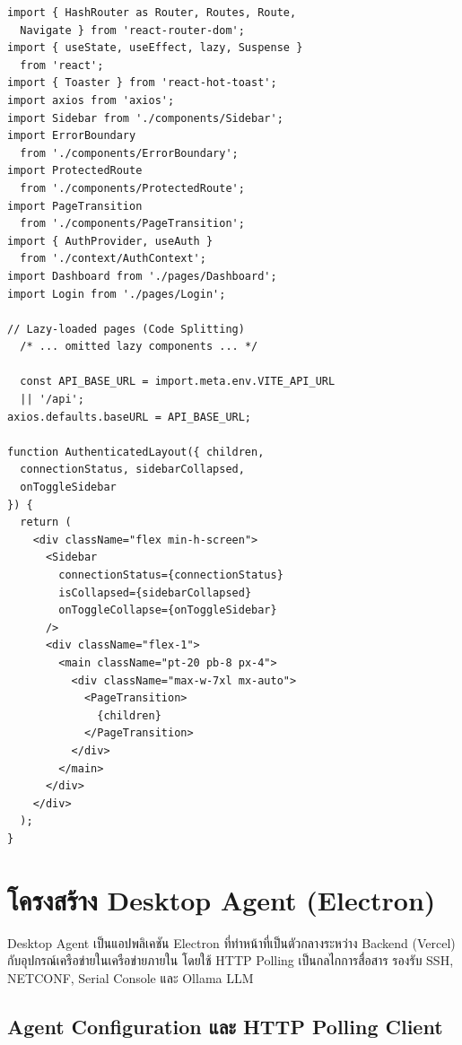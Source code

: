 \begin{lstlisting}[language=JSX, caption={frontend/src/App.jsx -- React Router และ Lazy Loading}]
import { HashRouter as Router, Routes, Route,
  Navigate } from 'react-router-dom';
import { useState, useEffect, lazy, Suspense }
  from 'react';
import { Toaster } from 'react-hot-toast';
import axios from 'axios';
import Sidebar from './components/Sidebar';
import ErrorBoundary
  from './components/ErrorBoundary';
import ProtectedRoute
  from './components/ProtectedRoute';
import PageTransition
  from './components/PageTransition';
import { AuthProvider, useAuth }
  from './context/AuthContext';
import Dashboard from './pages/Dashboard';
import Login from './pages/Login';

// Lazy-loaded pages (Code Splitting)
  /* ... omitted lazy components ... */

  const API_BASE_URL = import.meta.env.VITE_API_URL
  || '/api';
axios.defaults.baseURL = API_BASE_URL;

function AuthenticatedLayout({ children,
  connectionStatus, sidebarCollapsed,
  onToggleSidebar
}) {
  return (
    <div className="flex min-h-screen">
      <Sidebar
        connectionStatus={connectionStatus}
        isCollapsed={sidebarCollapsed}
        onToggleCollapse={onToggleSidebar}
      />
      <div className="flex-1">
        <main className="pt-20 pb-8 px-4">
          <div className="max-w-7xl mx-auto">
            <PageTransition>
              {children}
            </PageTransition>
          </div>
        </main>
      </div>
    </div>
  );
}
\end{lstlisting}

\section{โครงสร้าง Desktop Agent (Electron)}

\hspace*{1.3em}
Desktop Agent เป็นแอปพลิเคชัน Electron ที่ทำหน้าที่เป็นตัวกลางระหว่าง Backend (Vercel) กับอุปกรณ์เครือข่ายในเครือข่ายภายใน โดยใช้ HTTP Polling เป็นกลไกการสื่อสาร รองรับ SSH, NETCONF, Serial Console และ Ollama LLM

\subsection{Agent Configuration และ HTTP Polling Client}

